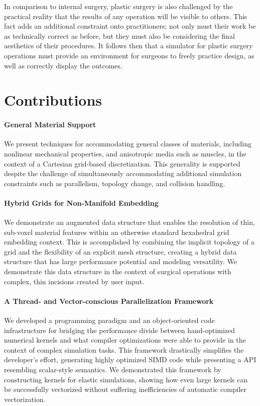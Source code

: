 In comparison to internal surgery, plastic surgery is also challenged by the
practical reality that the results of any operation will be visible to
others. This fact adds an additional constraint onto practitioners;
not only must their work be as technically correct as before, but they
must also be considering the final aesthetics of their procedures. It
follows then that a simulator for plastic surgery operations must
provide an environment for surgeons to freely practice design, as well
as correctly display the outcomes.

\section{Contributions}

\paragraph{General Material Support} We present techniques for
accommodating general classes of materials, including nonlinear
mechanical properties, and anisotropic media such as muscles, in the
context of a Cartesian grid-based discretization. This generality is
supported despite the challenge of simultaneously accommodating
additional simulation constraints such as parallelism, topology
change, and collision handling.

\paragraph{Hybrid Grids for Non-Manifold Embedding} We demonstrate an
augmented data structure that enables the resolution of thin,
sub-voxel material features within an otherwise standard hexahedral
grid embedding context. This is accomplished by combining the implicit
topology of a grid and the flexibility of an explicit mesh structure,
creating a hybrid data structure that has large performance potential
and modeling versatility. We demonstrate this data structure in the
context of surgical operations with complex, thin incisions created by
user input.

\paragraph{A Thread- and Vector-conscious Parallelization Framework}
We developed a programming paradigm and an object-oriented code
infrastructure for bridging the performance divide between
hand-optimized numerical kernels and what compiler optimizations were
able to provide in the context of complex simulation tasks. This
framework drastically simplifies the developer's effort, generating
highly optimized SIMD code while presenting a API resembling
scalar-style semantics. We demonstrated this framework by constructing
kernels for elastic simulations, showing how even large kernels can be
successfully vectorized without suffering inefficiencies of automatic
compiler vectorization.

